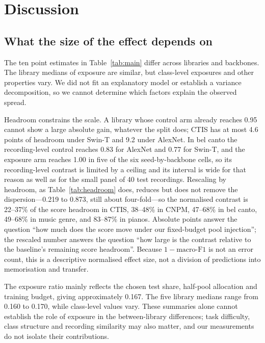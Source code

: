 \section{Discussion}\label{sec:discussion}

\subsection{What the size of the effect depends on}

The ten point estimates in Table~\ref{tab:main} differ across libraries and backbones. The
library medians of exposure are similar, but class-level exposures and other properties vary.
We did not fit an explanatory model or establish a variance decomposition, so we cannot determine
which factors explain the observed spread.

Headroom constrains the scale. A library whose control arm already reaches 0.95 cannot show a large
absolute gain, whatever the split does; CTIS has at most 4.6 points of headroom under Swin-T and
9.2 under AlexNet. In bel canto the recording-level control reaches 0.83 for AlexNet and 0.77 for Swin-T, and the
exposure arm reaches 1.00 in five of the six seed-by-backbone cells, so its recording-level
contrast is limited by a ceiling and its interval is wide for that reason as well as for the
small panel of 40 test recordings.
Rescaling by headroom, as Table~\ref{tab:headroom} does, reduces but does not remove
the dispersion---0.219 to 0.873, still about four-fold---so the normalised contrast is 22--37\% of the score headroom in CTIS, 38--48\% in
CNPM, 47--68\% in bel canto, 49--68\% in music genre, and 83--87\% in pianos. Absolute points answer the question ``how much does the score move under our fixed-budget pool
injection''; the rescaled number answers the question ``how large is the contrast relative to the
baseline's remaining score headroom''.
Because $1-\text{macro-F1}$ is not an error count, this is a descriptive normalised
effect size, not a division of predictions into memorisation and transfer.

The exposure ratio mainly reflects the chosen test share, half-pool allocation and training
budget, giving approximately 0.167. The five library medians range from 0.160 to 0.170, while
class-level values vary. These summaries alone cannot establish the role of exposure in the
between-library differences; task difficulty, class structure and recording similarity may also
matter, and our measurements do not isolate their contributions.

